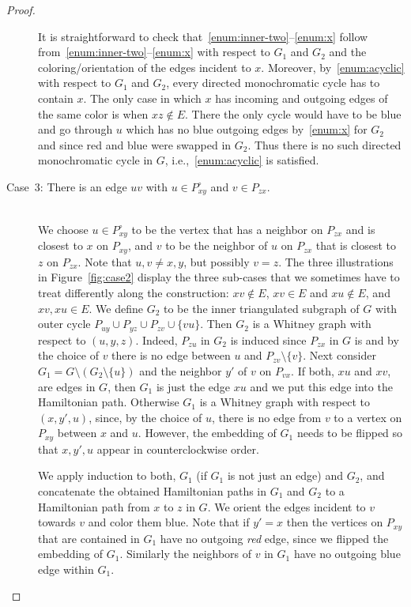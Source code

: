 \documentclass[a4paper,10pt]{article}
\theoremstyle{plain}
\newcommand{\inner}[1]{{#1}^{\circ}}
\begin{document}
\begin{proof}
\begin{description}
   It is straightforward to check that~\ref{enum:inner-two}--\ref{enum:x} follow from~\ref{enum:inner-two}--\ref{enum:x} with respect to $G_1$ and $G_2$ and the coloring/orientation of the edges incident to $x$. Moreover, by~\ref{enum:acyclic} with respect to $G_1$ and $G_2$, every directed monochromatic cycle has to contain $x$. The only case in which $x$ has incoming and outgoing edges of the same color is when $xz \notin E$. There the only cycle would have to be blue and go through $u$ which has no blue outgoing edges by~\ref{enum:x} for $G_2$ and since red and blue were swapped in $G_2$. Thus there is no such directed monochromatic cycle in $G$, i.e.,~\ref{enum:acyclic} is satisfied.
   
  \item[Case~3: There is an edge $uv$ with $u \in \inner{P}_{xy}$ and $v \in P_{zx}$.]{\ \\}  
   We choose $u \in \inner{P}_{xy}$ to be the vertex that has a neighbor on $P_{zx}$ and is closest to $x$ on $P_{xy}$, and $v$ to be the neighbor of $u$ on $P_{zx}$ that is closest to $z$ on $P_{zx}$. Note that $u,v \neq x,y$, but possibly $v=z$. The three illustrations in Figure~\ref{fig:case2} display the three sub-cases that we sometimes have to treat differently along the construction: $xv\notin E$,  $xv\in E$ and $xu\notin E$, and $xv,xu\in E$. We define $G_2$ to be the inner triangulated subgraph of $G$ with outer cycle $P_{uy} \cup P_{yz} \cup P_{zv} \cup \{vu\}$. Then $G_2$ is a Whitney graph with respect to $(u,y,z)$. Indeed, $P_{zu}$ in $G_2$ is induced since $P_{zx}$ in $G$ is and by the choice of $v$ there is no edge between $u$ and $P_{zv} \setminus \{v\}$. Next consider $G_1 = G \setminus (G_2 \setminus \{u\})$ and the neighbor $y'$ of $v$ on $P_{vx}$. If both, $xu$ and $xv$, are edges in $G$, then $G_1$ is just the edge $xu$ and we put this edge into the Hamiltonian path. Otherwise $G_1$ is a Whitney graph with respect to $(x,y',u)$, since, by the choice of $u$, there is no edge from $v$ to a vertex on $P_{xy}$ between $x$ and $u$. However, the embedding of $G_1$ needs to be flipped so that $x,y',u$ appear in counterclockwise order. 
 
   We apply induction to both, $G_1$ (if $G_1$ is not just an edge) and $G_2$, and concatenate the obtained Hamiltonian paths in $G_1$ and $G_2$ to a Hamiltonian path from $x$ to $z$ in $G$. We orient the edges incident to $v$ towards $v$ and color them blue. Note that if $y'=x$ then the vertices on $P_{xy}$ that are contained in $G_1$ have no outgoing \emph{red} edge, since we flipped the embedding of $G_1$. Similarly the neighbors of $v$ in $G_1$ have no outgoing blue edge within $G_1$.
 

\end{description}
\end{proof}
\end{document}
